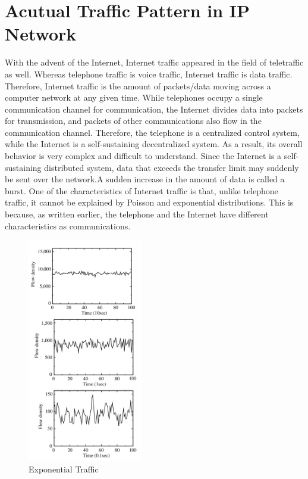 \section{Acutual Traffic Pattern in IP Network}
With the advent of the Internet, Internet traffic appeared in the field of teletraffic as well.
Whereas telephone traffic is voice traffic, Internet traffic is data traffic.
Therefore, Internet traffic is the amount of packets/data moving across a computer network at any given time.
While telephones occupy a single communication channel for communication, the Internet divides data into packets for transmission, and packets of other communications also flow in the communication channel.
Therefore, the telephone is a centralized control system, while the Internet is a self-sustaining decentralized system. 
As a result, its overall behavior is very complex and difficult to understand.
Since the Internet is a self-sustaining distributed system, data that exceeds the transfer limit may suddenly be sent over the network.A sudden increase in the amount of data is called a burst.
One of the characteristics of Internet traffic is that, unlike telephone traffic, it cannot be explained by Poisson and exponential distributions.\cite{Fukuda2004}
This is because, as written earlier, the telephone and the Internet have different characteristics as communications.
  \begin{figure}[ht]
    \centering
    \includegraphics[width=5cm]{img/exponential.png}
    \caption{Exponential Traffic \protect \footnotemark}
    \label{fig:exponential}  
  \end{figure}

